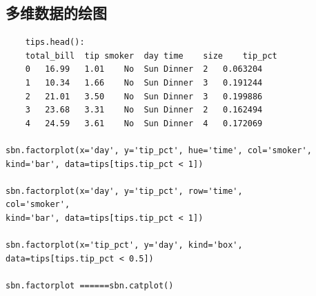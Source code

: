 \documentclass{article}
\begin{document}
\subsection{多维数据的绘图}
\begin{lstlisting}
	tips.head():
	total_bill	tip	smoker	day	time	size	tip_pct
	0	16.99	1.01	No	Sun	Dinner	2	0.063204
	1	10.34	1.66	No	Sun	Dinner	3	0.191244
	2	21.01	3.50	No	Sun	Dinner	3	0.199886
	3	23.68	3.31	No	Sun	Dinner	2	0.162494
	4	24.59	3.61	No	Sun	Dinner	4	0.172069
	
sbn.factorplot(x='day', y='tip_pct', hue='time', col='smoker', kind='bar', data=tips[tips.tip_pct < 1])

sbn.factorplot(x='day', y='tip_pct', row='time',
col='smoker',
kind='bar', data=tips[tips.tip_pct < 1])	

sbn.factorplot(x='tip_pct', y='day', kind='box',
data=tips[tips.tip_pct < 0.5])

sbn.factorplot ======sbn.catplot()
\end{lstlisting}
\end{document}
